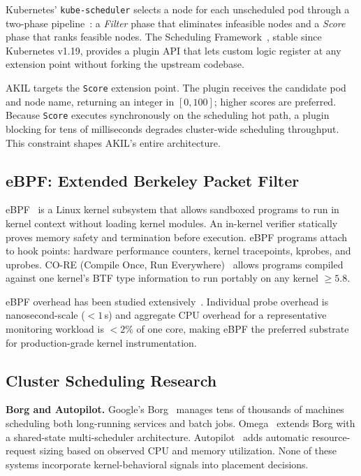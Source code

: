 \documentclass[10pt,conference,a4paper]{IEEEtran}
\begin{document}
Kubernetes' \texttt{kube-scheduler} selects a node for each unscheduled pod through a
two-phase pipeline~\cite{k8s_scheduling_framework}: a \emph{Filter} phase that
eliminates infeasible nodes and a \emph{Score} phase that ranks feasible nodes.
The Scheduling Framework~\cite{k8s_scheduling_framework}, stable since Kubernetes
v1.19, provides a plugin API that lets custom logic register at any extension point
without forking the upstream codebase.

AKIL targets the \texttt{Score} extension point. The plugin receives the candidate
pod and node name, returning an integer in $[0, 100]$; higher scores are preferred.
Because \texttt{Score} executes synchronously on the scheduling hot path, a plugin
blocking for tens of milliseconds degrades cluster-wide scheduling throughput.
This constraint shapes AKIL's entire architecture.

\subsection{eBPF: Extended Berkeley Packet Filter}

eBPF~\cite{ebpf_foundation} is a Linux kernel subsystem that allows sandboxed programs
to run in kernel context without loading kernel modules. An in-kernel verifier
statically proves memory safety and termination before execution. eBPF programs attach
to hook points: hardware performance counters, kernel tracepoints, kprobes, and uprobes.
CO-RE (Compile Once, Run Everywhere)~\cite{nakryiko2020bpf} allows programs compiled
against one kernel's BTF type information to run portably on any kernel $\ge 5.8$.

eBPF overhead has been studied extensively~\cite{vieira2020ebpf,goldshtein2022ebpf}.
Individual probe overhead is nanosecond-scale ($<1$\,\textmu s) and aggregate CPU
overhead for a representative monitoring workload is $<2\%$ of one core, making
eBPF the preferred substrate for production-grade kernel instrumentation.

\subsection{Cluster Scheduling Research}

\textbf{Borg and Autopilot.}
Google's Borg~\cite{borg2015} manages tens of thousands of machines scheduling both
long-running services and batch jobs. Omega~\cite{schwarzkopf2013omega} extends Borg
with a shared-state multi-scheduler architecture. Autopilot~\cite{wilkes2020autopilot}
adds automatic resource-request sizing based on observed CPU and memory utilization.
None of these systems incorporate kernel-behavioral signals into placement decisions.
\end{document}
